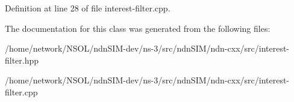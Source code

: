 Definition at line 28 of file interest-\/filter.\+cpp.



The documentation for this class was generated from the following files\+:\begin{DoxyCompactItemize}
\item 
/home/network/\+N\+S\+O\+L/ndn\+S\+I\+M-\/dev/ns-\/3/src/ndn\+S\+I\+M/ndn-\/cxx/src/interest-\/filter.\+hpp\item 
/home/network/\+N\+S\+O\+L/ndn\+S\+I\+M-\/dev/ns-\/3/src/ndn\+S\+I\+M/ndn-\/cxx/src/interest-\/filter.\+cpp\end{DoxyCompactItemize}
